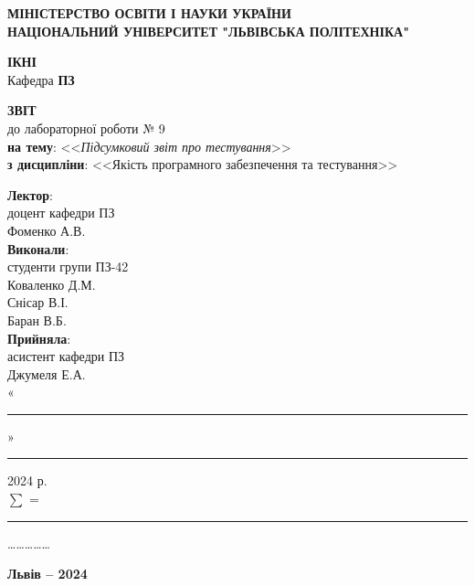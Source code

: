 \documentclass[oneside,14pt]{extarticle}
\newcommand\subject{Якість програмного забезпечення та тестування}
\newcommand\lecturer{доцент кафедри ПЗ\\Фоменко А.В.}
\newcommand\teacher{асистент кафедри ПЗ\\Джумеля Е.А.}
\newcommand\mygroup{ПЗ-42}
\newcommand\lab{9}
\newcommand\theme{Підсумковий звіт про тестування}
\begin{document}
\begin{normalsize}
	\begin{titlepage}
		\thispagestyle{empty}
		\begin{center}
			\textbf{МІНІСТЕРСТВО ОСВІТИ І НАУКИ УКРАЇНИ\\
				НАЦІОНАЛЬНИЙ УНІВЕРСИТЕТ "ЛЬВІВСЬКА ПОЛІТЕХНІКА"}
		\end{center}
		\begin{flushright}
			\textbf{ІКНІ}\\
			Кафедра \textbf{ПЗ}
		\end{flushright}
		\vspace{80pt}
		\begin{center}
			\textbf{ЗВІТ}\\
			\vspace{10pt}
			до лабораторної роботи № \lab\\
			\textbf{на тему}: <<\textit{\theme}>>\\
			\textbf{з дисципліни}: <<\subject>>
		\end{center}
		\vspace{80pt}
		\begin{flushright}
			
			\textbf{Лектор}:\\
			\lecturer\\
			\vspace{28pt}
			\textbf{Виконали}:\\
			
			студенти групи \mygroup\\
			Коваленко Д.М.\\
			Снісар В.І.\\
			Баран В.Б.\\
			\vspace{28pt}
			\textbf{Прийняла}:\\
			
			\teacher\\
			
			\vspace{28pt}
			«\rule{1cm}{0.15mm}» \rule{1.5cm}{0.15mm} 2024 р.\\
			$\sum$ = \rule{1cm}{0.15mm}……………\\
			
		\end{flushright}
		\vspace{\fill}
		\begin{center}
			\textbf{Львів – 2024}
		\end{center}
	\end{titlepage}
		

\end{normalsize}
\end{document}
